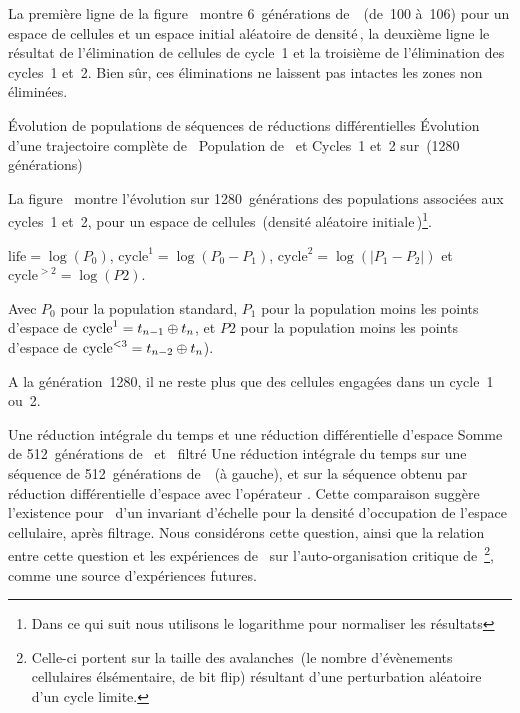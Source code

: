 \noindent%
La premi\`ere ligne de la figure~ montre
6~g\'en\'erations de~~(de~100 \`a~106) pour un espace de
 cellules et un espace initial al\'eatoire de
densit\'e\,\undemi, la deuxi\`eme ligne le r\'esultat de l'\'elimination de
cellules de cycle~1 et la troisi\`eme de l'\'elimination des cycles~1 et~2. %
Bien s\^ur, ces \'eliminations ne laissent pas intactes les zones non \'elimin\'ees. %

%
{\'Evolution de populations de s\'equences de r\'eductions dif\-f\'erentiel\-les}%
{\'Evolution d'une trajectoire compl\`ete de~}%
{Population de~ et Cycles~1 et~2 sur~(1280 g\'en\'erations)}

\noindent%
La figure~ montre l'\'evolution sur 1280~g\'en\'erations
des populations associ\'ees aux cycles~1 et~2, pour un espace de
 cellules~(densit\'e al\'eatoire initiale\,\undemi)\footnote{%
  Dans ce qui suit nous utilisons le logarithme pour normaliser les
  r\'esultats}. %

\noindent%
$\text{life} = \log(P_0)$, %
$\text{cycle}^1 = \log(P_0 - P_1)$, %
$\text{cycle}^2 = \log(|P_1 - P_2|)$ %
et $\text{cycle}^{> 2} = \log (P2)$. %

\noindent%
Avec $P_0$ pour la population standard, %
$P_1$ pour la population moins les points d'espace %
de $\text{cycle}^1 = t_{n-1} \oplus t_{n}$, %
et $P2$ pour la population moins les points d'espace %
de $\text{cycle}^{<3} = t_{n-2} \oplus t_{n}$). %

\noindent%
A la g\'en\'eration~1280, il ne reste plus que des cellules
engag\'ees dans un cycle~1 ou~2. %

%
{Une r\'eduction int\'egrale du temps et une r\'eduction diff\'erentiel\-le d'espace}%
{Somme de 512~g\'en\'erations de~ et~ filtr\'e}%
{Une r\'eduction int\'egrale du temps sur une s\'equence de 512~g\'en\'erations
  de~~(\`a gauche), et sur la s\'equence obtenu par r\'eduction
  diff\'erentielle d'espace avec l'op\'erateur \xor. %
  Cette comparaison sugg\`ere l'existence pour~ d'un
  invariant d'\'echelle pour la densit\'e d'occupation de l'espace
  cellulaire, apr\`es filtrage. %
  Nous consid\'erons cette question, ainsi que la relation entre cette question et les
  exp\'eriences de~\cite{Bak93} sur l'auto-organisation critique
  de~\footnote{%
    Celle-ci portent sur la taille des avalanches~(le nombre
    d'\'ev\`enements cellulaires \'els\'ementaire, \ie de bit flip) r\'esultant
    d'une perturbation al\'eatoire d'un cycle limite.}, %
  comme une source d'exp\'eriences futures.}

